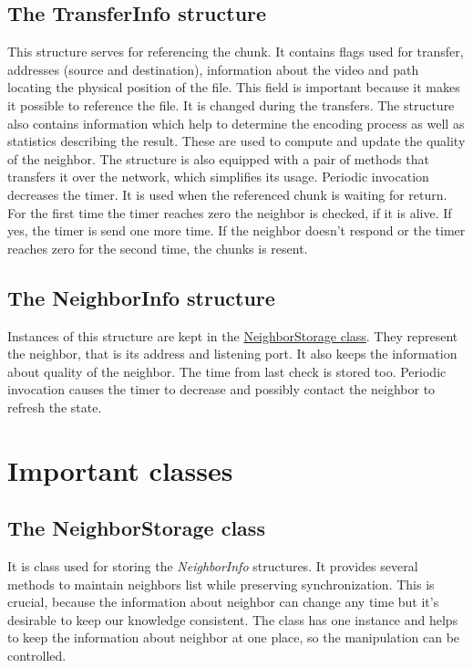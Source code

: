 \subsection{The TransferInfo
structure}\label{the-transferinfo-structure}

This structure serves for referencing the chunk. It contains flags used
for transfer, addresses (source and destination), information about the
video and path locating the physical position of the file. This field is
important because it makes it possible to reference the file. It is
changed during the transfers. The structure also contains information
which help to determine the encoding process as well as statistics
describing the result. These are used to compute and update the quality
of the neighbor. The structure is also equipped with a pair of methods
that transfers it over the network, which simplifies its usage. Periodic
invocation decreases the timer. It is used when the referenced chunk is
waiting for return. For the first time the timer reaches zero the
neighbor is checked, if it is alive. If yes, the timer is send one more
time. If the neighbor doesn't respond or the timer reaches zero for the
second time, the chunks is resent.

\subsection{The NeighborInfo
structure}\label{the-neighborinfo-structure}

Instances of this structure are kept in the
\hyperref[neighborstorage]{NeighborStorage class}. They represent the
neighbor, that is its address and listening port. It also keeps the
information about quality of the neighbor. The time from last check is
stored too. Periodic invocation causes the timer to decrease and
possibly contact the neighbor to refresh the state.

\section{Important classes}\label{important-classes}

\subsection{The NeighborStorage class}\label{the-neighborstorage-class}

It is class used for storing the \textit{NeighborInfo} structures. It
provides several methods to maintain neighbors list while preserving
synchronization. This is crucial, because the information about neighbor
can change any time but it's desirable to keep our knowledge consistent.
The class has one instance and helps to keep the information about
neighbor at one place, so the manipulation can be controlled.

